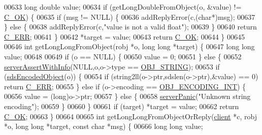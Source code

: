 \begin{DoxyCode}
{00633     \textcolor{keywordtype}{long} \textcolor{keywordtype}{double} value;
00634     \textcolor{keywordflow}{if} (getLongDoubleFromObject(o, &value) != \hyperlink{server_8h_a303769ef1065076e68731584e758d3e1}{C\_OK}) \{
00635         \textcolor{keywordflow}{if} (msg != NULL) \{
00636             addReplyError(c,(\textcolor{keywordtype}{char}*)msg);
00637         \} \textcolor{keywordflow}{else} \{
00638             addReplyError(c,\textcolor{stringliteral}{"value is not a valid float"});
00639         \}
00640         \textcolor{keywordflow}{return} \hyperlink{server_8h_af98ac28d5f4d23d7ed5985188e6fb7d1}{C\_ERR};
00641     \}
00642     *target = value;
00643     \textcolor{keywordflow}{return} \hyperlink{server_8h_a303769ef1065076e68731584e758d3e1}{C\_OK};
00644 \}
00645 
00646 \textcolor{keywordtype}{int} getLongLongFromObject(robj *o, \textcolor{keywordtype}{long} \textcolor{keywordtype}{long} *target) \{
00647     \textcolor{keywordtype}{long} \textcolor{keywordtype}{long} value;
00648 
00649     \textcolor{keywordflow}{if} (o == NULL) \{
00650         value = 0;
00651     \} \textcolor{keywordflow}{else} \{
00652         \hyperlink{server_8h_a7308f76cbff9a8d3797fe78190b91282}{serverAssertWithInfo}(NULL,o,o->type == 
      \hyperlink{server_8h_a65236ea160f69cdef33ec942092af88f}{OBJ\_STRING});
00653         \textcolor{keywordflow}{if} (\hyperlink{server_8h_afcfb5bd97af52d1dbce331745cae030c}{sdsEncodedObject}(o)) \{
00654             \textcolor{keywordflow}{if} (string2ll(o->ptr,sdslen(o->ptr),&value) == 0) \textcolor{keywordflow}{return} \hyperlink{server_8h_af98ac28d5f4d23d7ed5985188e6fb7d1}{C\_ERR};
00655         \} \textcolor{keywordflow}{else} \textcolor{keywordflow}{if} (o->encoding == \hyperlink{server_8h_ae934cf008a0be0ef009c92c2d006a816}{OBJ\_ENCODING\_INT}) \{
00656             value = (\textcolor{keywordtype}{long})o->ptr;
00657         \} \textcolor{keywordflow}{else} \{
00658             \hyperlink{server_8h_a11cc378e7778a830b41240578de3b204}{serverPanic}(\textcolor{stringliteral}{"Unknown string encoding"});
00659         \}
00660     \}
00661     \textcolor{keywordflow}{if} (target) *target = value;
00662     \textcolor{keywordflow}{return} \hyperlink{server_8h_a303769ef1065076e68731584e758d3e1}{C\_OK};
00663 \}
00664 
00665 \textcolor{keywordtype}{int} getLongLongFromObjectOrReply(\hyperlink{structclient}{client} *c, robj *o, \textcolor{keywordtype}{long} \textcolor{keywordtype}{long} *target, \textcolor{keyword}{const} \textcolor{keywordtype}{char} *msg) \{
00666     \textcolor{keywordtype}{long} \textcolor{keywordtype}{long} value;
}
\end{DoxyCode}
